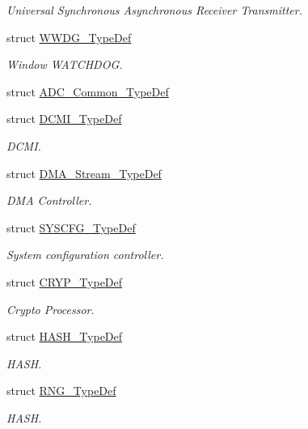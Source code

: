 \begin{DoxyCompactItemize}
\begin{DoxyCompactList}\small\item\em Universal Synchronous Asynchronous Receiver Transmitter. \end{DoxyCompactList}\item 
struct \hyperlink{struct_w_w_d_g___type_def}{W\-W\-D\-G\-\_\-\-Type\-Def}
\begin{DoxyCompactList}\small\item\em Window W\-A\-T\-C\-H\-D\-O\-G. \end{DoxyCompactList}\item 
struct \hyperlink{struct_a_d_c___common___type_def}{A\-D\-C\-\_\-\-Common\-\_\-\-Type\-Def}
\item 
struct \hyperlink{struct_d_c_m_i___type_def}{D\-C\-M\-I\-\_\-\-Type\-Def}
\begin{DoxyCompactList}\small\item\em D\-C\-M\-I. \end{DoxyCompactList}\item 
struct \hyperlink{struct_d_m_a___stream___type_def}{D\-M\-A\-\_\-\-Stream\-\_\-\-Type\-Def}
\begin{DoxyCompactList}\small\item\em D\-M\-A Controller. \end{DoxyCompactList}\item 
struct \hyperlink{struct_s_y_s_c_f_g___type_def}{S\-Y\-S\-C\-F\-G\-\_\-\-Type\-Def}
\begin{DoxyCompactList}\small\item\em System configuration controller. \end{DoxyCompactList}\item 
struct \hyperlink{struct_c_r_y_p___type_def}{C\-R\-Y\-P\-\_\-\-Type\-Def}
\begin{DoxyCompactList}\small\item\em Crypto Processor. \end{DoxyCompactList}\item 
struct \hyperlink{struct_h_a_s_h___type_def}{H\-A\-S\-H\-\_\-\-Type\-Def}
\begin{DoxyCompactList}\small\item\em H\-A\-S\-H. \end{DoxyCompactList}\item 
struct \hyperlink{struct_r_n_g___type_def}{R\-N\-G\-\_\-\-Type\-Def}
\begin{DoxyCompactList}\small\item\em H\-A\-S\-H. \end{DoxyCompactList}\item 

\end{DoxyCompactItemize}
